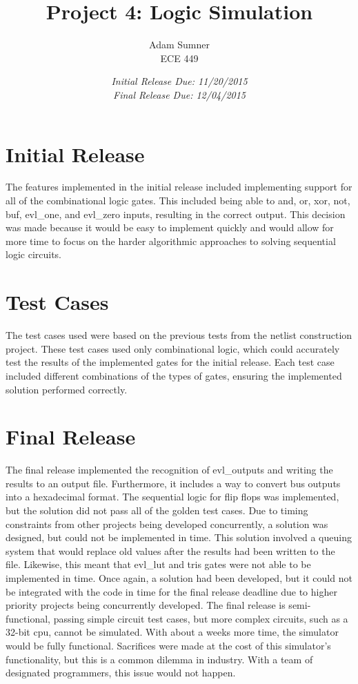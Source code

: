 \documentclass[12pt]{article}
\title{\textbf{Project 4: Logic Simulation}}
\author{Adam Sumner\\ECE 449}
\date{\textit{Initial Release Due: 11/20/2015}\\ \textit{Final Release Due: 12/04/2015}}
\begin{document}
\maketitle

\section{Initial Release}
The features implemented in the initial release included implementing support for all of the combinational logic gates. This included being able to and, or, xor, not, buf, evl\_one, and evl\_zero inputs, resulting in the correct output. This decision was made because it would be easy to implement quickly and would allow for more time to focus on the harder algorithmic approaches to solving sequential logic circuits.

\section{Test Cases}
The test cases used were based on the previous tests from the netlist construction project. These test cases used only combinational logic, which could accurately test the results of the implemented gates for the initial release. Each test case included different combinations of the types of gates, ensuring the implemented solution performed correctly.

\section{Final Release}
The final release implemented the recognition of evl\_outputs and writing the results to an output file. Furthermore, it includes a way to convert bus outputs into a hexadecimal format. The sequential logic for flip flops was implemented, but the solution did not pass all of the golden test cases. Due to timing constraints from other projects being developed concurrently, a solution was designed, but could not be implemented in time. This solution involved a queuing system that would replace old values after the results had been written to the file. Likewise, this meant that evl\_lut and  tris gates were not able to be implemented in time. Once again, a solution had been developed, but it could not be integrated with the code in time for the final release deadline due to higher priority projects being concurrently developed. The final release is semi-functional, passing simple circuit test cases, but more complex circuits, such as a 32-bit cpu, cannot be simulated. With about a weeks more time, the simulator would be fully functional. Sacrifices were made at the cost of this simulator's functionality, but this is a common dilemma in industry. With a team of designated programmers, this issue would not happen.
\end{document}
